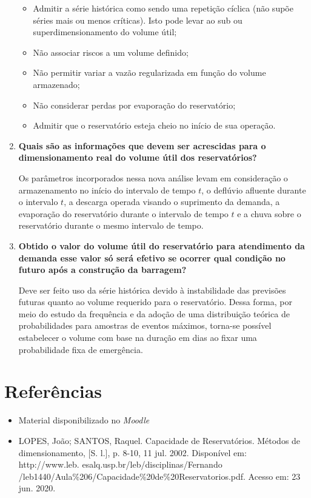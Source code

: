 \documentclass[a4paper, 12pt]{article}
\newcommand{\tbf}[1]{\textbf{#1}}
\begin{document}
\begin{enumerate}
		\begin{itemize}
			\item Admitir a série histórica como sendo uma repetição cíclica (não supõe séries mais ou menos críticas). Isto pode levar ao sub ou superdimensionamento do volume útil;
			\item Não associar riscos a um volume definido;
			\item Não permitir variar a vazão regularizada em função do volume armazenado;
			\item Não considerar perdas por evaporação do reservatório;
			\item Admitir que o reservatório esteja cheio no início de sua operação.
 		\end{itemize}
		
		\item\tbf{Quais são as informações que devem ser acrescidas para o dimensionamento real do volume útil dos reservatórios?}
		
		Os parâmetros incorporados nessa nova análise levam em consideração o armazenamento no início do intervalo de tempo $t$, o deflúvio afluente durante o intervalo $t$, a descarga operada visando o suprimento da demanda, a evaporação do reservatório durante o intervalo de tempo $t$ e a chuva sobre o reservatório durante o mesmo intervalo de tempo.
		
		\item\tbf{Obtido o valor do volume útil do reservatório para atendimento da demanda esse valor só será efetivo se ocorrer qual condição no futuro após a construção da barragem?}
		
		Deve ser feito uso da série histórica devido à instabilidade das previsões futuras quanto ao volume requerido para o reservatório. Dessa forma, por meio do estudo da frequência e da adoção de uma distribuição teórica de probabilidades para amostras de eventos máximos, torna-se possível estabelecer o volume com base na duração em dias ao fixar uma probabilidade fixa de emergência.
		
		
	\end{enumerate}

	\section{Referências}
	
	\begin{itemize}
		\item Material disponibilizado no \textit{Moodle}
		
		\item LOPES, João; SANTOS, Raquel. Capacidade de Reservatórios. Métodos de dimensionamento, [S. l.], p. 8-10, 11 jul. 2002. Disponível em: http://www.leb. esalq.usp.br/leb/disciplinas/Fernando /leb1440/Aula\%206/C\-apacidade\%20de\%20Reservatorios.pdf. Acesso em: 23 jun. 2020.
	\end{itemize}
\end{document}
